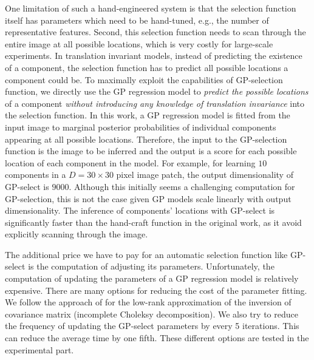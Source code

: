 One limitation of such a hand-engineered system is that the selection function itself has parameters which need to be hand-tuned, e.g., the number of representative features.%
Second, this selection function needs to scan through the entire image at all possible locations, which is very costly for large-scale experiments.
%
In translation invariant models, instead of predicting the existence of a component, the selection function has to predict all possible locations a component could be.
To maximally exploit the capabilities of GP-selection function, we directly use the GP regression model to \textit{predict the possible locations} of a component \textit{without introducing any knowledge of translation invariance} into the selection function. In this work, a GP regression model is fitted from the input image to marginal posterior probabilities of individual components appearing at all possible locations. Therefore, the input to the GP-selection function is the image to be inferred and the output is a score for each possible location of each component in the model.
For example, for learning $10$ components in a $D=30\times 30$ pixel image patch, the output dimensionality of GP-select is $9000$.
Although this initially seems a challenging computation for GP-selection, this is not the case given GP models scale linearly with output dimensionality.
The inference of components' locations with GP-select is significantly faster than the hand-craft function in the original work, as it avoid explicitly scanning through the image.

The additional price we have to pay for an automatic selection function like GP-select is the computation of adjusting its parameters. Unfortunately, the computation of updating the parameters of a GP regression model is relatively expensive. There are many options for reducing the cost of the parameter fitting. We follow the approach of \citep[][section 5]{SonGreBicLowGue11} for the low-rank approximation of the inversion of covariance matrix (incomplete Choleksy decomposition). We also try to reduce the frequency of updating the GP-select parameters by every 5 iterations. This can reduce the average time by one fifth. These different options are tested in the experimental part.


